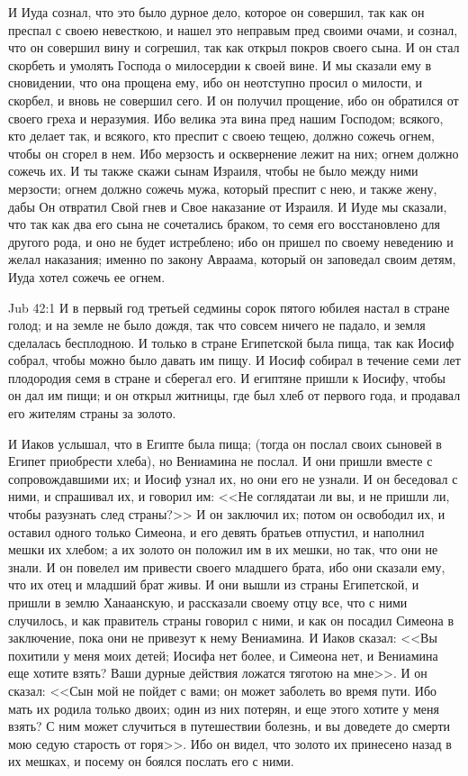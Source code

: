И Иуда сознал, что это было дурное дело, которое
он совершил, так как он преспал с своею невесткою,
и нашел это неправым пред своими очами, и сознал,
что он совершил вину и согрешил, так как открыл
покров своего сына. И он стал скорбеть и умолять
Господа о милосердии к своей вине. И мы сказали
ему в сновидении, что она прощена ему, ибо он
неотступно просил о милости, и скорбел, и вновь не
совершил сего. И он получил прощение, ибо он
обратился от своего греха и неразумия. Ибо велика
эта вина пред нашим Господом; всякого, кто делает
так, и всякого, кто преспит с своею тещею, должно
сожечь огнем, чтобы он сгорел в нем. Ибо мерзость
и осквернение лежит на них; огнем должно сожечь
их. И ты также скажи сынам Израиля, чтобы не было
между ними мерзости; огнем должно сожечь мужа,
который преспит с нею, и также жену, дабы Он
отвратил Свой гнев и Свое наказание от Израиля. И
Иуде мы сказали, что так как два его сына не
сочетались браком, то семя его восстановлено для
другого рода, и оно не будет истреблено; ибо он
пришел по своему неведению и желал наказания;
именно по закону Авраама, который он заповедал
своим детям, Иуда хотел сожечь ее огнем.

\vs Jub 42:1
И в первый год третьей седмины сорок пятого юбилея
настал в стране голод; и на земле не было дождя,
так что совсем ничего не падало, и земля
сделалась бесплодною. И только в стране
Египетской была пища, так как Иосиф собрал, чтобы
можно было давать им пищу. И Иосиф собирал в
течение семи лет плодородия семя в стране и
сберегал его. И египтяне пришли к Иосифу, чтобы он
дал им пищи; и он открыл житницы, где был хлеб от
первого года, и продавал его жителям страны за
золото.

И Иаков услышал, что в Египте была пища; (тогда
он послал своих сыновей в Египет приобрести
хлеба), но Вениамина не послал. И они пришли
вместе с сопровождавшими их; и Иосиф узнал их,
но они его не узнали. И он беседовал с ними, и
спрашивал их, и говорил им: <<Не соглядатаи ли
вы, и не пришли ли, чтобы разузнать след
страны?>> И он заключил их; потом он освободил
их, и оставил одного только Симеона, и его девять
братьев отпустил, и наполнил мешки их хлебом; а их
золото он положил им в их мешки, но так, что они не
знали. И он повелел им привести своего младшего
брата, ибо они сказали ему, что их отец и младший
брат живы. И они вышли из страны Египетской, и
пришли в землю Ханаанскую, и рассказали своему
отцу все, что с ними случилось, и как правитель
страны говорил с ними, и как он посадил Симеона в
заключение, пока они не привезут к нему
Вениамина. И Иаков сказал: <<Вы похитили у меня
моих детей; Иосифа нет более, и Симеона нет, и
Вениамина еще хотите взять? Ваши дурные действия
ложатся тяготою на мне>>. И он сказал: <<Сын мой
не пойдет с вами; он может заболеть во время
пути. Ибо мать их родила только двоих; один
из них потерян, и еще этого хотите у меня взять? С
ним может случиться в путешествии болезнь, и вы
доведете до смерти мою седую старость от горя>>.
Ибо он видел, что золото их принесено назад в их
мешках, и посему он боялся послать его с ними.

